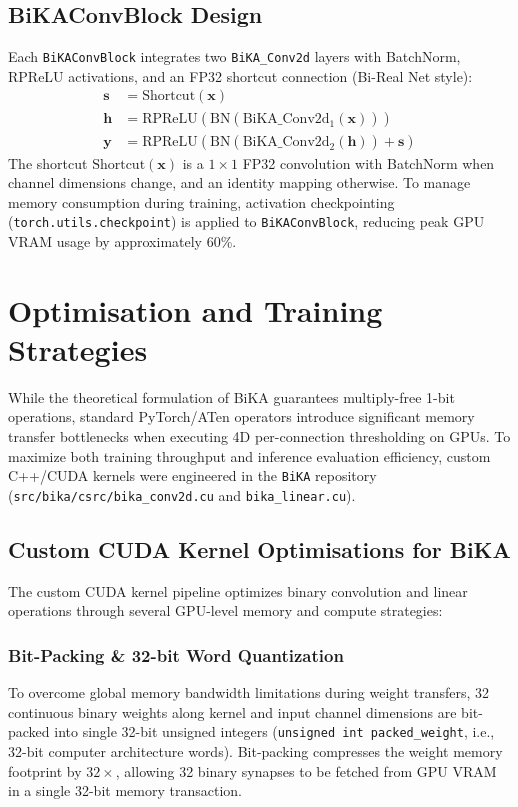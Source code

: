 \documentclass[a4paper]{report}
\begin{document}
\subsection{BiKAConvBlock Design}
Each \texttt{BiKAConvBlock} integrates two \texttt{BiKA\_Conv2d} layers with BatchNorm, RPReLU activations, and an FP32 shortcut connection (Bi-Real Net style):
\begin{align}
    \mathbf{s} &= \text{Shortcut}(\mathbf{x}) \\
    \mathbf{h} &= \text{RPReLU}\left(\text{BN}\left(\text{BiKA\_Conv2d}_1(\mathbf{x})\right)\right) \\
    \mathbf{y} &= \text{RPReLU}\left(\text{BN}\left(\text{BiKA\_Conv2d}_2(\mathbf{h})\right) + \mathbf{s}\right)
\end{align}
The shortcut $\text{Shortcut}(\mathbf{x})$ is a $1\times1$ FP32 convolution with BatchNorm when channel dimensions change, and an identity mapping otherwise. To manage memory consumption during training, activation checkpointing (\texttt{torch.utils.checkpoint}) is applied to \texttt{BiKAConvBlock}, reducing peak GPU VRAM usage by approximately 60\%.

\section{Optimisation and Training Strategies}
\label{sec:training}
While the theoretical formulation of BiKA guarantees multiply-free 1-bit operations, standard PyTorch/ATen operators introduce significant memory transfer bottlenecks when executing 4D per-connection thresholding on GPUs. To maximize both training throughput and inference evaluation efficiency, custom C++/CUDA kernels were engineered in the \texttt{BiKA} repository (\texttt{src/bika/csrc/bika\_conv2d.cu} and \texttt{bika\_linear.cu}).

\subsection{Custom CUDA Kernel Optimisations for BiKA}
\label{sec:cuda_kernels}
The custom CUDA kernel pipeline optimizes binary convolution and linear operations through several GPU-level memory and compute strategies:

\subsubsection{Bit-Packing \& 32-bit Word Quantization}
To overcome global memory bandwidth limitations during weight transfers, 32 continuous binary weights along kernel and input channel dimensions are bit-packed into single 32-bit unsigned integers (\texttt{unsigned int packed\_weight}, i.e., 32-bit computer architecture words). Bit-packing compresses the weight memory footprint by $32\times$, allowing 32 binary synapses to be fetched from GPU VRAM in a single 32-bit memory transaction.
\end{document}
